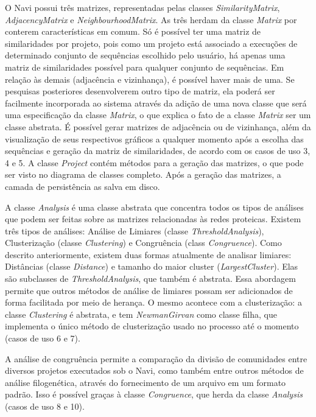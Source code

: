O Navi possui três matrizes, representadas pelas classes \textit{SimilarityMatrix}, \textit{AdjacencyMatrix} e \textit{NeighbourhoodMatrix}. As três herdam
da classe \textit{Matrix} por conterem características em comum. Só é possível ter uma matriz de similaridades por projeto, pois como um projeto está associado
a execuções de determinado conjunto de sequências escolhido pelo usuário, há apenas uma matriz de similaridades possível para qualquer conjunto de sequências.
Em relação às demais (adjacência e vizinhança), é possível haver mais de uma. Se pesquisas posteriores desenvolverem outro tipo de matriz, ela poderá ser
facilmente incorporada ao sistema através da adição de uma nova classe que será uma especificação da classe \textit{Matrix}, o que explica o fato de a classe
\textit{Matrix} ser um classe abstrata. É possível gerar matrizes de adjacência ou de vizinhança, além da visualização de seus respectivos gráficos a qualquer
momento após a escolha das sequências e geração da matriz de similaridades, de acordo com os casos de uso 3, 4 e 5. A classe \textit{Project} contém métodos
para a geração das matrizes, o que pode ser visto no diagrama de classes completo. Após a geração das matrizes, a camada de persistência as salva em disco.

A classe \textit{Analysis} é uma classe abstrata que concentra todos os tipos de análises que podem ser feitas sobre as matrizes relacionadas às redes
proteicas. Existem três tipos de análises: Análise de Limiares (classe \textit{ThresholdAnalysis}), Clusterização (classe \textit{Clustering}) e
Congruência (class \textit{Congruence}). Como descrito anteriormente, existem duas formas atualmente de analisar limiares: Distâncias (classe
\textit{Distance}) e tamanho do maior cluster (\textit{LargestCluster}). Elas são subclasses de \textit{ThresholdAnalysis}, que também é abstrata. Essa
abordagem permite que outros métodos de análise de limiares possam ser adicionados de forma facilitada por meio de herança. O mesmo acontece com a
clusterização: a classe \textit{Clustering} é abstrata, e tem \textit{NewmanGirvan} como classe filha, que implementa o único método de clusterização
usado no processo até o momento (casos de uso 6 e 7).

A análise de congruência permite a comparação da divisão de comunidades entre diversos projetos executados sob o Navi, como também entre outros métodos de
análise filogenética, através do fornecimento de um arquivo em um formato padrão. Isso é possível graças à classe \textit{Congruence}, que herda da classe
\textit{Analysis} (casos de uso 8 e 10).

